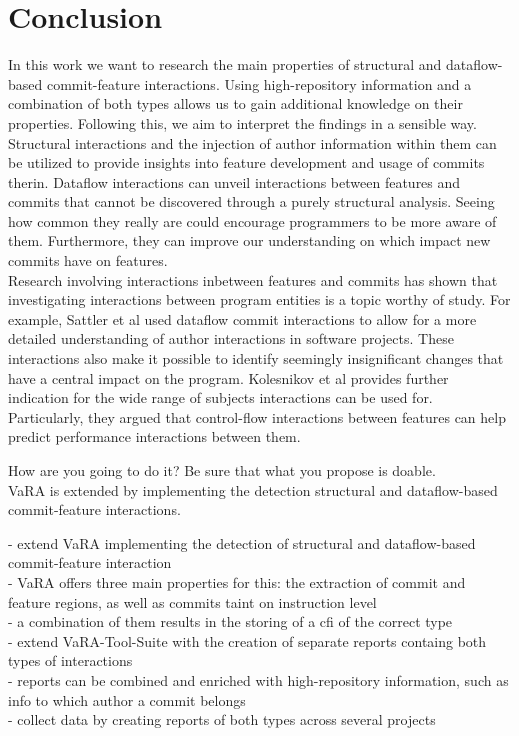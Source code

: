 \section*{Conclusion}\label{ch:conclusion}

In this work we want to research the main properties of structural and dataflow-based commit-feature interactions.
Using high-repository information and a combination of both types allows us to gain additional knowledge on their properties.
Following this, we aim to interpret the findings in a sensible way.
Structural interactions and the injection of author information within them can be utilized to provide insights into feature development and usage of commits therin.
Dataflow interactions can unveil interactions between features and commits that cannot be discovered through a purely structural analysis.
Seeing how common they really are could encourage programmers to be more aware of them.
Furthermore, they can improve our understanding on which impact new commits have on features. \\

Research involving interactions inbetween features and commits has shown that investigating interactions between program entities is a topic worthy of study.
For example, Sattler et al used dataflow commit interactions to allow for a more detailed understanding of author interactions in software projects. 
These interactions also make it possible to identify seemingly insignificant changes that have a central impact on the program.
Kolesnikov et al provides further indication for the wide range of subjects interactions can be used for.
Particularly, they argued that control-flow interactions between features can help predict performance interactions between them.

How are you going to do it? Be sure that what you propose is doable. \\

VaRA is extended by implementing the detection structural and dataflow-based commit-feature interactions.


- extend VaRA implementing the detection of structural and dataflow-based commit-feature interaction \\
- VaRA offers three main properties for this: the extraction of commit and feature regions, as well as commits taint on instruction level \\
- a combination of them results in the storing of a cfi of the correct type \\
- extend VaRA-Tool-Suite with the creation of separate reports containg both types of interactions \\
- reports can be combined and enriched with high-repository information, such as info to which author a commit belongs \\
- collect data by creating reports of both types across several projects \\






